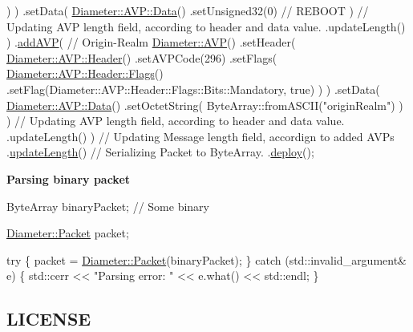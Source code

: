 \begin{DoxyCode}
                        )
                )
                .setData(
                    \hyperlink{classDiameter_1_1AVP_1_1Data}{Diameter::AVP::Data}()
                        .setUnsigned32(0) \textcolor{comment}{// REBOOT}
                )
                \textcolor{comment}{// Updating AVP length field, according to header and data value.}
                .updateLength()
        )
        .\hyperlink{classDiameter_1_1Packet_a36d19bb1e2ff1517dea5927bd77cc7b9}{addAVP}( \textcolor{comment}{// Origin-Realm}
            \hyperlink{classDiameter_1_1AVP}{Diameter::AVP}()
                .setHeader(
                    \hyperlink{classDiameter_1_1AVP_1_1Header}{Diameter::AVP::Header}()
                        .setAVPCode(296)
                        .setFlags(
                            \hyperlink{classDiameter_1_1AVP_1_1Header_1_1Flags}{Diameter::AVP::Header::Flags}()
                                .setFlag(Diameter::AVP::Header::Flags::Bits::Mandatory, \textcolor{keyword}{true})
                        )
                )
                .setData(
                    \hyperlink{classDiameter_1_1AVP_1_1Data}{Diameter::AVP::Data}()
                        .setOctetString(
                            ByteArray::fromASCII(\textcolor{stringliteral}{"originRealm"})
                        )
                )
                \textcolor{comment}{// Updating AVP length field, according to header and data value.}
                .updateLength()
        )
        \textcolor{comment}{// Updating Message length field, accordign to added AVPs}
        .\hyperlink{classDiameter_1_1Packet_a822041d59387ef2a8c0f48c2c4bc1054}{updateLength}()
        \textcolor{comment}{// Serializing Packet to ByteArray.}
        .\hyperlink{classDiameter_1_1Packet_a6120f6d21c5d2f4c4ed4a8602953923c}{deploy}();
\end{DoxyCode}


{\bfseries Parsing binary packet} 
\begin{DoxyCode}
ByteArray binaryPacket; \textcolor{comment}{// Some binary}

\hyperlink{classDiameter_1_1Packet}{Diameter::Packet} packet;

\textcolor{keywordflow}{try}
\{
    packet = \hyperlink{classDiameter_1_1Packet}{Diameter::Packet}(binaryPacket);
\}
\textcolor{keywordflow}{catch} (std::invalid\_argument& e)
\{
    std::cerr << \textcolor{stringliteral}{"Parsing error: "} << e.what() << std::endl;
\}
\end{DoxyCode}


\subsection*{L\+I\+C\+E\+N\+SE}



